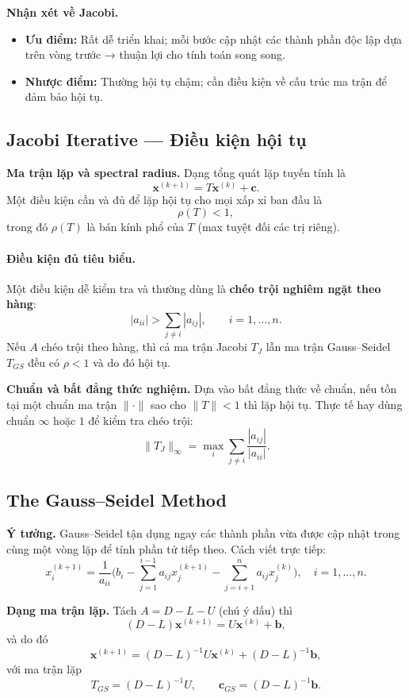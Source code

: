 \textbf{Nhận xét về Jacobi.}
\begin{itemize}
  \item \textbf{Ưu điểm:} Rất dễ triển khai; mỗi bước cập nhật các thành phần độc lập dựa trên vòng trước → thuận lợi cho tính toán song song.
  \item \textbf{Nhược điểm:} Thường hội tụ chậm; cần điều kiện về cấu trúc ma trận để đảm bảo hội tụ.
\end{itemize}

\subsection{Jacobi Iterative — Điều kiện hội tụ}

\textbf{Ma trận lặp và spectral radius.}
Dạng tổng quát lặp tuyến tính là
\[
\mathbf{x}^{(k+1)} = T\mathbf{x}^{(k)} + \mathbf{c}.
\]
Một điều kiện cần và đủ để lặp hội tụ cho mọi xấp xỉ ban đầu là
\[
\rho(T) < 1,
\]
trong đó $\rho(T)$ là bán kính phổ của $T$ (max tuyệt đối các trị riêng).

\paragraph{Điều kiện đủ tiêu biểu.}
Một điều kiện dễ kiểm tra và thường dùng là \textbf{chéo trội nghiêm ngặt theo hàng}:
\[
|a_{ii}| > \sum_{j\ne i} |a_{ij}|,\qquad i=1,\dots,n.
\]
Nếu $A$ chéo trội theo hàng, thì cả ma trận Jacobi $T_J$ lẫn ma trận Gauss--Seidel $T_{GS}$ đều có $\rho<1$ và do đó hội tụ.

\textbf{Chuẩn và bất đẳng thức nghiệm.}
Dựa vào bất đẳng thức về chuẩn, nếu tồn tại một chuẩn ma trận $\|\cdot\|$ sao cho $\|T\|<1$ thì lặp hội tụ. Thực tế hay dùng chuẩn $\infty$ hoặc $1$ để kiểm tra chéo trội:
\[
\|T_J\|_\infty = \max_i \sum_{j\ne i} \frac{|a_{ij}|}{|a_{ii}|}.
\]

\subsection{The Gauss--Seidel Method}

\textbf{Ý tưởng.}
Gauss--Seidel tận dụng ngay các thành phần vừa được cập nhật trong cùng một vòng lặp để tính phần tử tiếp theo. Cách viết trực tiếp:
\[
x_i^{(k+1)} = \frac{1}{a_{ii}} \Big( b_i - \sum_{j=1}^{i-1} a_{ij} x_j^{(k+1)} - \sum_{j=i+1}^{n} a_{ij} x_j^{(k)}\Big),
\quad i=1,\dots,n.
\]

\textbf{Dạng ma trận lặp.}
Tách $A=D-L-U$ (chú ý dấu) thì
\[
(D-L)\mathbf{x}^{(k+1)} = U \mathbf{x}^{(k)} + \mathbf{b},
\]
và do đó
\[
\mathbf{x}^{(k+1)} = (D-L)^{-1} U \mathbf{x}^{(k)} + (D-L)^{-1}\mathbf{b},
\]
với ma trận lặp
\[
T_{GS} = (D-L)^{-1} U,\qquad \mathbf{c}_{GS} = (D-L)^{-1}\mathbf{b}.
\]


